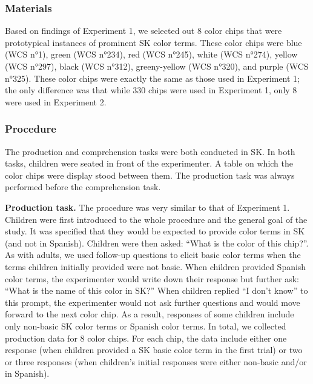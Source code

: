 \documentclass[,man,floatsintext]{apa6}
\theoremstyle{definition}
\theoremstyle{definition}
\theoremstyle{definition}
\theoremstyle{remark}
\begin{document}
\subsubsection{Materials}\label{materials-1}

Based on findings of Experiment 1, we selected out 8 color chips that
were prototypical instances of prominent SK color terms. These color
chips were blue (WCS n°1), green (WCS n°234), red (WCS n°245), white
(WCS n°274), yellow (WCS n°297), black (WCS n°312), greeny-yellow (WCS
n°320), and purple (WCS n°325). These color chips were exactly the same
as those used in Experiment 1; the only difference was that while 330
chips were used in Experiment 1, only 8 were used in Experiment 2.

\subsubsection{Procedure}\label{procedure-1}

The production and comprehension tasks were both conducted in SK. In
both tasks, children were seated in front of the experimenter. A table
on which the color chips were display stood between them. The production
task was always performed before the comprehension task.

\textbf{Production task.} The procedure was very similar to that of
Experiment 1. Children were first introduced to the whole procedure and
the general goal of the study. It was specified that they would be
expected to provide color terms in SK (and not in Spanish). Children
were then asked: \enquote{What is the color of this chip?}. As with
adults, we used follow-up questions to elicit basic color terms when the
terms children initially provided were not basic. When children provided
Spanish color terms, the experimenter would write down their response
but further ask: \enquote{What is the name of this color in SK?} When
children replied \enquote{I don't know} to this prompt, the experimenter
would not ask further questions and would move forward to the next color
chip. As a result, responses of some children include only non-basic SK
color terms or Spanish color terms. In total, we collected production
data for 8 color chips. For each chip, the data include either one
response (when children provided a SK basic color term in the first
trial) or two or three responses (when children's initial responses were
either non-basic and/or in Spanish).
\end{document}
